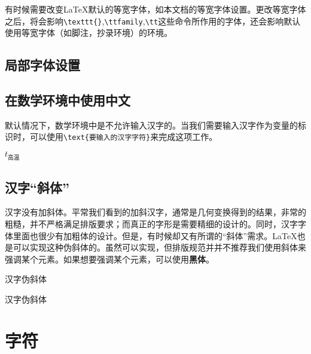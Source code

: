 有时候需要改变\LaTeX 默认的等宽字体，如本文档的等宽字体设置。更改等宽字体之后，将会影响\lstinline|\texttt{}|,\lstinline|\ttfamily|,\lstinline|\tt|这些命令所作用的字体，还会影响默认使用等宽字体（如脚注，抄录环境）的环境。

\begin{latex}
\setmonofont{Source Code Pro}    %
\end{latex}

\subsection{局部字体设置}

\begin{latex}
\newfontfamily{}    %
\end{latex}

\subsection{在数学环境中使用中文}
默认情况下，数学环境中是不允许输入汉字的。当我们需要输入汉字作为变量的标识时，可以使用\lstinline|\text{要输入的汉字字符}|来完成这项工作。

\begin{codeshow}
$t_{\text{高温}}$
\end{codeshow}

\subsection{汉字“斜体”}
汉字没有加斜体。平常我们看到的加斜汉字，通常是几何变换得到的结果，非常的粗糙，并不严格满足排版要求；而真正的字形是需要精细的设计的。同时，汉字字体里面也很少有加粗体的设计。但是，有时候却又有所谓的“斜体”需求。\LaTeX 也是可以实现这种伪斜体的。虽然可以实现，但排版规范并并不推荐我们使用斜体来强调某个元素。如果想要强调某个元素，可以使用\textbf{黑体}。

\begin{center}
{汉字伪斜体}
\end{center}

\begin{latex}
{汉字伪斜体}
\end{latex}

\section{字符}

